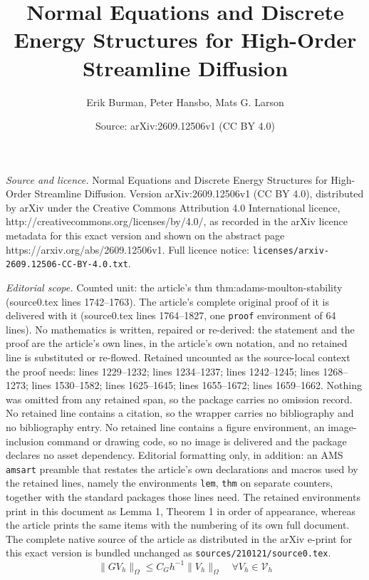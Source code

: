 \documentclass[10pt,a4paper]{amsart}
\title{Normal Equations and Discrete Energy Structures for High-Order Streamline Diffusion}
\author{Erik Burman, Peter Hansbo, Mats G. Larson}
\date{Source: arXiv:2609.12506v1 (CC BY 4.0)}
\begin{document}
\maketitle

\noindent\emph{Source and licence.} Normal Equations and Discrete Energy Structures for High-Order Streamline Diffusion. Version arXiv:2609.12506v1 (CC BY 4.0), distributed by arXiv under the Creative Commons Attribution 4.0 International licence, http://creativecommons.org/licenses/by/4.0/, as recorded in the arXiv licence metadata for this exact version and shown on the abstract page https://arxiv.org/abs/2609.12506v1. Full licence notice: \texttt{licenses/arxiv-2609.12506-CC-BY-4.0.txt}.\par\smallskip

\noindent\textit{Editorial scope.} Counted unit: the article's thm thm:adams-moulton-stability (source0.tex lines 1742--1763). The article's complete original proof of it is delivered with it (source0.tex lines 1764--1827, one \texttt{proof} environment of 64 lines). No mathematics is written, repaired or re-derived: the statement and the proof are the article's own lines, in the article's own notation, and no retained line is substituted or re-flowed.  Retained uncounted as the source-local context the proof needs: lines 1229--1232; lines 1234--1237; lines 1242--1245; lines 1268--1273; lines 1530--1582; lines 1625--1645; lines 1655--1672; lines 1659--1662.  Nothing was omitted from any retained span, so the package carries no omission record.  No retained line contains a citation, so the wrapper carries no bibliography and no bibliography entry.  No retained line contains a figure environment, an image-inclusion command or drawing code, so no image is delivered and the package declares no asset dependency.  Editorial formatting only, in addition: an AMS \texttt{amsart} preamble that restates the article's own declarations and macros used by the retained lines, namely the environments \texttt{lem}, \texttt{thm} on separate counters, together with the standard packages those lines need.  The retained environments print in this document as Lemma 1, Theorem 1 in order of appearance, whereas the article prints the same items with the numbering of its own full document.  The complete native source of the article as distributed in the arXiv e-print for this exact version is bundled unchanged as \texttt{sources/210121/source0.tex}.
\begin{equation}
\|GV_h\|_{\Omega}\le C_Gh^{-1}\|V_h\|_{\Omega}
\quad \forall V_h\in\mathcal V_h \label{eq:adams-inverse-inequality}
\end{equation}
\end{document}
